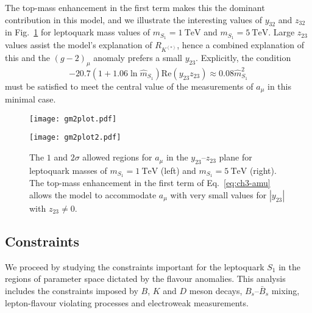 The top-mass enhancement in the first term makes this the dominant contribution
in this model, and we illustrate the interesting values of $y_{32}$ and $z_{32}$
in Fig.~\ref{fig:ch3-gm2plots} for leptoquark mass values of
$m_{S_{1}}=\SI{1}{\TeV}$ and $m_{S_{1}}=\SI{5}{\TeV}$. Large $z_{23}$ values
assist the model's explanation of $R_{K^{(*)}}$, hence a combined explanation of
this and the $(g-2)_\mu$ anomaly prefers a small $y_{23}$. Explicitly, the
condition~\cite{Bauer:2015knc}
\begin{equation} \label{eq:ch3-bnamueq}
  -20.7 (1 + 1.06 \ln\hat{m}_{S_{1}}) \text{Re}(y_{23} z_{23}) \approx 0.08 \hat{m}_{S_{1}}^2
\end{equation}
must be satisfied to meet the central value of the measurements of $a_\mu$ in
this minimal case.

\begin{figure}[t]
  \centering
\begin{minipage}[t]{.45\linewidth}
\centering \texttt{[image: gm2plot.pdf]}
 \label{fig:ch3-gm2plot}
\end{minipage}%
\hfill
\begin{minipage}[t]{.45\linewidth}
\centering \texttt{[image: gm2plot2.pdf]}
 \label{fig:ch3-gm2plot2}
\end{minipage}
\caption[The $1$ and $2\sigma$ allowed regions for $a_\mu$ in the
$y_{23}$--$z_{23}$ plane for leptoquark masses of $m_{S_{1}} = \SI{1}{\TeV}$
(left) and $m_{S_{1}} = \SI{5}{\TeV}$ (right).]{The $1$ and $2\sigma$ allowed
  regions for $a_\mu$ in the $y_{23}$--$z_{23}$ plane for leptoquark masses of
  $m_{S_{1}} = \SI{1}{\TeV}$ (left) and $m_{S_{1}} = \SI{5}{\TeV}$ (right). The
  top-mass enhancement in the first term of Eq.~\eqref{eq:ch3-amu} allows the model
  to accommodate $a_\mu$ with very small values for $|y_{23}|$ with
  $z_{23} \neq 0$.}\label{fig:ch3-gm2plots}
\end{figure}

\subsection{Constraints}
\label{sec:ch3-constraints}

We proceed by studying the constraints important for the leptoquark $S_{1}$ in
the regions of parameter space dictated by the flavour anomalies. This analysis
includes the constraints imposed by $B$, $K$ and $D$ meson decays,
$B_s$--$\bar{B}_s$ mixing, lepton-flavour violating processes and electroweak
measurements.


